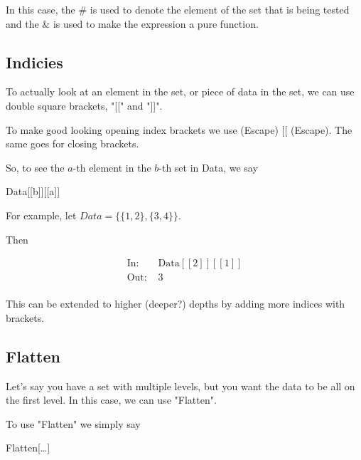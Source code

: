 \documentclass[11pt,a4paper,twoside]{article}
\begin{document}
				In this case, the $ \# $ is used to denote the element of the set that is being tested and the $ \& $ is used to make the expression a pure function.
					
			\subsection{Indicies}
				
				To actually look at an element in the set, or piece of data in the set, we can use double square brackets, "[[" and "]]".
					
				To make good looking opening index brackets we use (Escape) [[ (Escape).  The same goes for closing brackets.
					
				So, to see the $a$-th element in the $b$-th set in Data, we say
					
				\begin{center} Data[[b]][[a]] \end{center}
					
				For example, let $ Data = \{ \{ 1,2 \} , \{ 3,4 \} \} $.
					
				Then 
					
				\begin{align*}
					\text{In: }& \text{Data}[[2]][[1]] \\
					\text{Out: }& 3 \\
				\end{align*}
					
					This can be extended to higher (deeper?) depths by adding more indices with brackets.
					
			\subsection{Flatten}
					
				Let's say you have a set with multiple levels, but you want the data to be all on the first level.  In this case, we can use "Flatten".
				
				To use "Flatten" we simply say
					
				\begin{center} Flatten[\dots] \end{center}
				
\end{document}
